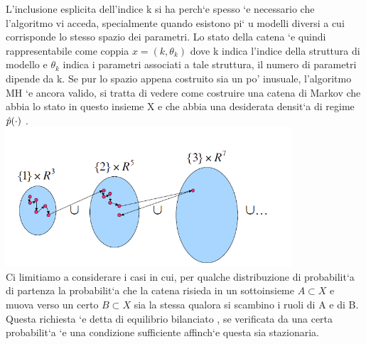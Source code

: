 L’inclusione esplicita dell’indice k si ha perch`e spesso `e necessario che l’algoritmo vi
acceda, specialmente quando esistono pi`
u modelli diversi a cui corrisponde lo stesso
spazio dei parametri.
Lo stato della catena `e quindi rappresentabile come coppia $x = (k, \theta_k )$ dove k indica
l’indice della struttura di modello e $\theta_k$ indica i parametri associati a tale struttura,
il numero di parametri dipende da k.
Se pur lo spazio appena costruito sia un po’ inusuale, l’algoritmo MH `e ancora
valido, si tratta di vedere come costruire una catena di Markov che abbia lo stato
in questo insieme X e che abbia una desiderata densit`a di regime $\hat{p}(\cdot)$ .\\
\includegraphics[width=0.8\textwidth]{RJMCMCImage.png}\\ 
Ci limitiamo a considerare i casi in cui, per qualche distribuzione di probabilit`a di
partenza la probabilit`a che la catena risieda in un sottoinsieme $A \subset X$ e muova
verso un certo $B\subset X$ sia la stessa qualora si scambino i ruoli di A e di B. Questa
richiesta `e detta di equilibrio bilanciato , se verificata da una certa probabilit`a `e una
condizione sufficiente affinch`e questa sia stazionaria.

